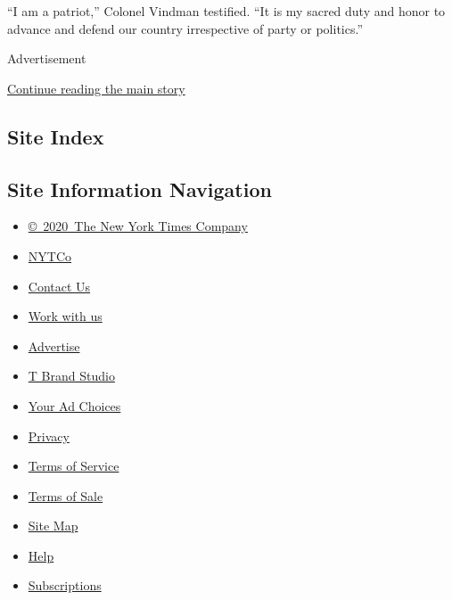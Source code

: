 ``I am a patriot,'' Colonel Vindman testified. ``It is my sacred duty
and honor to advance and defend our country irrespective of party or
politics.''

Advertisement

\protect\hyperlink{after-bottom}{Continue reading the main story}

\hypertarget{site-index}{%
\subsection{Site Index}\label{site-index}}

\hypertarget{site-information-navigation}{%
\subsection{Site Information
Navigation}\label{site-information-navigation}}

\begin{itemize}
\tightlist
\item
  \href{https://help.nytimes.com/hc/en-us/articles/115014792127-Copyright-notice}{©~2020~The
  New York Times Company}
\end{itemize}

\begin{itemize}
\tightlist
\item
  \href{https://www.nytco.com/}{NYTCo}
\item
  \href{https://help.nytimes.com/hc/en-us/articles/115015385887-Contact-Us}{Contact
  Us}
\item
  \href{https://www.nytco.com/careers/}{Work with us}
\item
  \href{https://nytmediakit.com/}{Advertise}
\item
  \href{http://www.tbrandstudio.com/}{T Brand Studio}
\item
  \href{https://www.nytimes.com/privacy/cookie-policy\#how-do-i-manage-trackers}{Your
  Ad Choices}
\item
  \href{https://www.nytimes.com/privacy}{Privacy}
\item
  \href{https://help.nytimes.com/hc/en-us/articles/115014893428-Terms-of-service}{Terms
  of Service}
\item
  \href{https://help.nytimes.com/hc/en-us/articles/115014893968-Terms-of-sale}{Terms
  of Sale}
\item
  \href{https://spiderbites.nytimes.com}{Site Map}
\item
  \href{https://help.nytimes.com/hc/en-us}{Help}
\item
  \href{https://www.nytimes.com/subscription?campaignId=37WXW}{Subscriptions}
\end{itemize}
